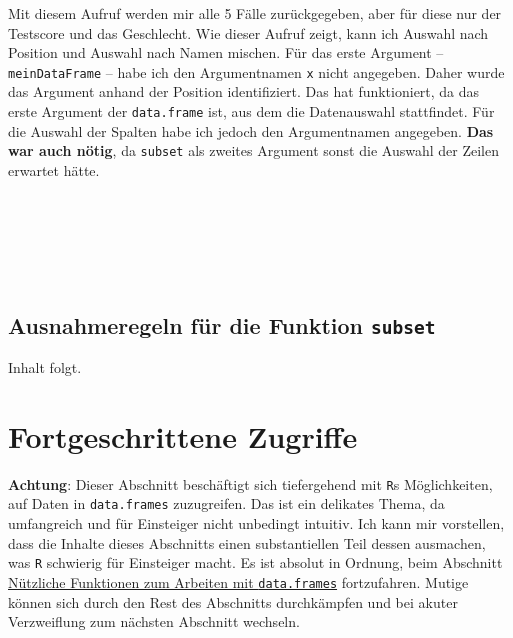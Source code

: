 \documentclass[12pt,]{tufte-book}
\theoremstyle{definition}
\theoremstyle{definition}
\theoremstyle{definition}
\theoremstyle{remark}
\begin{document}
Mit diesem Aufruf werden mir alle 5 Fälle zurückgegeben, aber für diese
nur der Testscore und das Geschlecht. Wie dieser Aufruf zeigt, kann ich
Auswahl nach Position und Auswahl nach Namen mischen. Für das erste
Argument -- \texttt{meinDataFrame} -- habe ich den Argumentnamen
\texttt{x} nicht angegeben. Daher wurde das Argument anhand der Position
identifiziert. Das hat funktioniert, da das erste Argument der
\texttt{data.frame} ist, aus dem die Datenauswahl stattfindet. Für die
Auswahl der Spalten habe ich jedoch den Argumentnamen angegeben.
\textbf{Das war auch nötig}, da \texttt{subset} als zweites Argument
sonst die Auswahl der Zeilen erwartet hätte.

~


~

~

\subsection{\texorpdfstring{Ausnahmeregeln für die Funktion
\texttt{subset}}{Ausnahmeregeln für die Funktion subset}}\label{ausnahmeregeln-fuxfcr-die-funktion-subset}

Inhalt folgt.

\hypertarget{fortgeschritten}{\section{Fortgeschrittene
Zugriffe}\label{fortgeschritten}}

\textbf{Achtung}: Dieser Abschnitt beschäftigt sich tiefergehend mit
\texttt{R}s Möglichkeiten, auf Daten in \texttt{data.frames}
zuzugreifen. Das ist ein delikates Thema, da umfangreich und für
Einsteiger nicht unbedingt intuitiv. Ich kann mir vorstellen, dass die
Inhalte dieses Abschnitts einen substantiellen Teil dessen ausmachen,
was \texttt{R} schwierig für Einsteiger macht. Es ist absolut in
Ordnung, beim Abschnitt \protect\hyperlink{convenient}{Nützliche
Funktionen zum Arbeiten mit \texttt{data.frames}} fortzufahren. Mutige
können sich durch den Rest des Abschnitts durchkämpfen und bei akuter
Verzweiflung zum nächsten Abschnitt wechseln.
\end{document}

